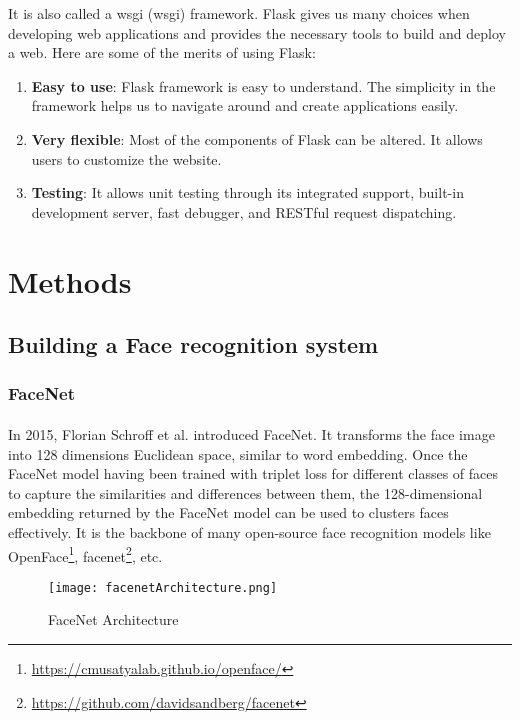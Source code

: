 It is also called a \acrlong{wsgi} (\acrshort{wsgi}) framework. Flask gives us many choices when developing web applications and provides the necessary tools to build and deploy a web. Here are some of the merits of using Flask: 

\begin{enumerate}
    \item \textbf{Easy to use}: Flask framework is easy to understand. The simplicity in the framework helps us to navigate around and create applications easily.
    \item \textbf{Very flexible}: Most of the components of Flask can be altered. It allows users to customize the website.
    \item \textbf{Testing}: It allows unit testing through its integrated support, built-in development server, fast debugger, and RESTful request dispatching.
\end{enumerate}

\clearpage
\section{Methods}

\subsection{Building a Face recognition system}

\subsubsection{FaceNet}
\paragraph{}
In 2015, Florian Schroff et al.\cite{DBLP:journals/corr/SchroffKP15} introduced FaceNet. It transforms the face image into 128 dimensions Euclidean space, similar to word embedding. Once the FaceNet model having been trained with triplet loss for different classes of faces to capture the similarities and differences between them, the 128-dimensional embedding returned by the FaceNet model can be used to clusters faces effectively. It is the backbone of many open-source face recognition models like OpenFace\footnote{\url{https://cmusatyalab.github.io/openface/}}, facenet\footnote{\url{https://github.com/davidsandberg/facenet}}, etc.

\begin{figure}[H]
    \centering
    \texttt{[image: facenetArchitecture.png]}
    \caption{FaceNet Architecture}
\end{figure}


